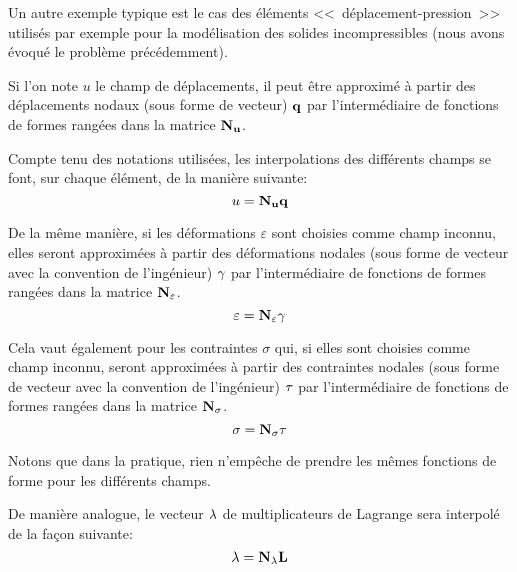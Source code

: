 \medskip
Un autre exemple typique est le cas des éléments <<~déplacement-pression~>>
utilisés par exemple pour la modélisation des solides incompressibles (nous avons
évoqué le problème précédemment).



\bigskip
{}

\medskip
Si l'on note $u$ le champ de déplacements, il peut être approximé à partir
des déplacements nodaux (sous forme de vecteur) $\mathbf{q}$ par l'intermédiaire
de fonctions de formes rangées dans la matrice $\mathbf{N_u}$.

Compte tenu des notations utilisé{}es, les interpolations des diffé{}rents
champs se font, sur chaque é{}lé{}ment, de la maniè{}re suivante:
\begin{equation}
   u=\mathbf{N_u}\mathbf{q}
\end{equation}

De la même manière, si les dé{}formations $\varepsilon$ sont choisies comme champ inconnu,
elles seront approximées à partir des déformations nodales (sous forme de vecteur avec
la convention de l'ingénieur) $\mathbf{\gamma}$ par l'intermédiaire de fonctions de formes rangées 
dans la matrice $\mathbf{N_\varepsilon}$.
\begin{equation}
   \varepsilon = \mathbf{N_\varepsilon}\mathbf{\gamma}
\end{equation}

Cela vaut également pour les contraintes $\sigma$ qui, si elles sont choisies comme champ
inconnu, seront approximées à partir des contraintes nodales (sous forme de vecteur avec
la convention de l'ingénieur) $\mathbf{\tau}$ par l'intermédiaire de fonctions de formes rangées 
dans la matrice $\mathbf{N_\sigma}$.
\begin{equation}
   \sigma = \mathbf{N_\sigma}\mathbf{\tau}
\end{equation}

Notons que dans la pratique, rien n'empêche de prendre les mê{}mes fonctions
de forme pour les diffé{}rents champs.

\medskip
De maniè{}re analogue, le vecteur $\mathbf{\lambda}$ de multiplicateurs
de Lagrange sera interpolé{} de la fa\c{c}on suivante:
\begin{equation}
   \mathbf{\lambda}=\mathbf{N_\lambda}\mathbf{L}
\end{equation}

